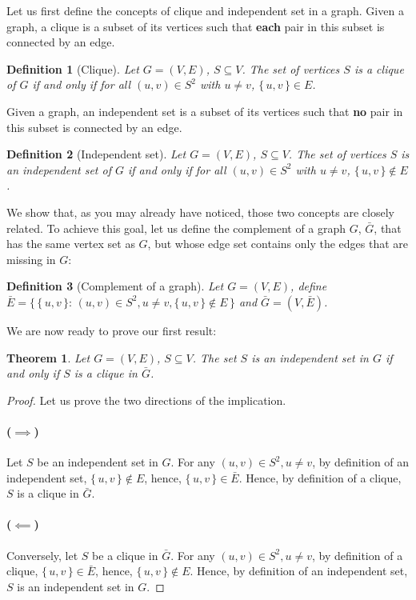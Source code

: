 \documentclass{article}
\newcommand{\theoremname}{Theorem}
\newcommand{\definitionname}{Definition}
\newtheorem{theorem}{\theoremname}
\newtheorem{definition}{\definitionname}
\newcommand{\st}{\colon\,}
\begin{document}
Let us first define the concepts of clique and independent set in a graph.
Given a graph, a clique is a subset of its vertices such that \textbf{each} pair in this
subset is connected by an edge.

\begin{definition}[Clique]
  Let $G=(V,E)$, $S\subseteq V$. The set of vertices $S$ is a clique of $G$
  if and only if for all $(u,v) \in S^2$ with $u\ne v$, $\{\,u,v\,\} \in E$.
\end{definition}

Given a graph, an independent set is a subset of its vertices such that
\textbf{no} pair in this
subset is connected by an edge.
\begin{definition}[Independent set]
  Let $G=(V,E)$, $S\subseteq V$. The set of vertices $S$ is an independent set
  of $G$ if and only if for all $(u,v) \in S^2$ with $u\ne v$, $\{\,u,v\,\} \not\in E$.
\end{definition}

We show that, as you may already have noticed, those two concepts are
closely related. To achieve this goal, let us define the complement of a graph
$G$, $\bar{G}$, that has the same vertex set as $G$, but whose edge set
contains only the edges that are missing in $G$:
\begin{definition}[Complement of a graph]
  Let $G = (V,E)$, define $\bar{E}=\{\,\{\,u,v\,\} \st (u,v) \in S^2,
  u \ne v, \{\,u,v\,\} \not\in E\,\}$ and $\bar{G} = (V,\bar{E})$.
\end{definition}

We are now ready to prove our first result:
\begin{theorem}\label{is-cl}
  Let $G = (V,E)$, $S \subseteq V$. The set $S$ is an independent set in $G$ if
  and only if $S$ is a clique in $\bar{G}$.
\end{theorem}

\begin{proof}
  Let us prove the two directions of the implication.
  \paragraph{($\implies$)}%
  Let $S$ be an independent set in $G$.
  For any $(u,v) \in S^2, u \ne v$, by definition of an independent set,
  $\{\,u,v\,\} \not\in E$, hence, $\{\,u,v\,\} \in \bar{E}$. Hence, by
  definition of a clique, $S$ is a clique in $\bar{G}$.

  \paragraph{($\impliedby$)}%
  Conversely, let $S$ be a clique in $\bar{G}$.
  For any $(u,v) \in S^2, u \ne v$, by definition of a clique,
  $\{\,u,v\,\} \in \bar{E}$, hence, $\{\,u,v\,\} \not\in E$. Hence, by
  definition of an independent set, $S$ is an independent set in $G$.
\end{proof}
\end{document}
